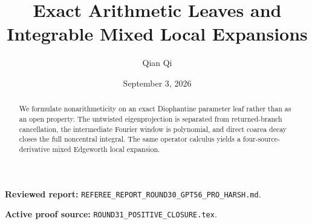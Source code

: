 \documentclass[11pt,reqno]{amsart}
\title[A2 Round 31 revision]{Exact Arithmetic Leaves and Integrable Mixed Local Expansions}
\author{Qian Qi}
\date{September 3, 2026}
\begin{document}
\begin{abstract}
We formulate nonarithmeticity on an exact Diophantine parameter leaf rather than as an open property.  The untwisted eigenprojection is separated from returned-branch cancellation, the intermediate Fourier window is polynomial, and direct coarea decay closes the full noncentral integral.  The same operator calculus yields a four-source-derivative mixed Edgeworth local expansion.
\end{abstract}
\maketitle
\noindent\textbf{Reviewed report:} \texttt{REFEREE\_REPORT\_ROUND30\_GPT56\_PRO\_HARSH.md}.\par
\noindent\textbf{Active proof source:} \texttt{ROUND31\_POSITIVE\_CLOSURE.tex}.\par

\end{document}
